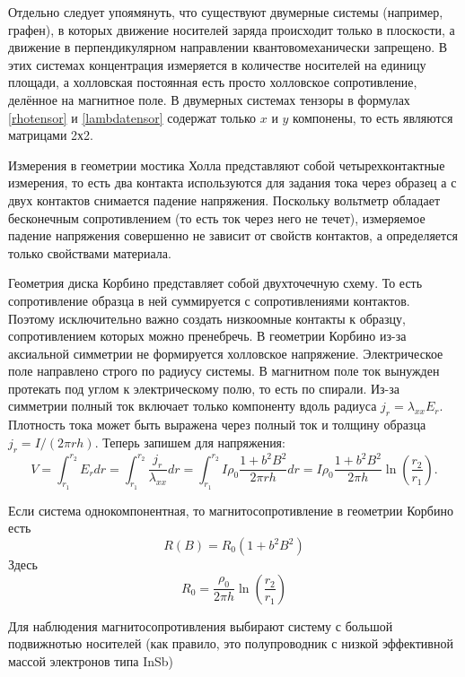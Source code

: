 Отдельно следует упоямянуть, что существуют двумерные системы (например, графен), в которых движение носителей заряда происходит только в плоскости, а движение в перпендикулярном направлении квантовомеханически запрещено. В этих системах концентрация измеряется в количестве носителей на единицу площади, а холловская постоянная есть просто холловское сопротивление, делённое на магнитное поле. В двумерных системах тензоры в формулах \ref{rhotensor} и \ref{lambdatensor} содержат только $x$ и $y$ компонены, то есть являются матрицами 2х2.

Измерения в геометрии мостика Холла представляют собой четырехконтактные измерения, то есть два контакта используются для задания тока через образец а с двух контактов снимается падение напряжения. Поскольку вольтметр обладает бесконечным сопротивлением (то есть ток через него не течет), измеряемое падение напряжения совершенно не зависит от свойств контактов, а определяется только свойствами материала.

Геометрия диска Корбино представляет собой двухточечную схему. То есть сопротивление образца в ней суммируется с сопротивлениями контактов. Поэтому исключительно важно создать низкоомные контакты к образцу, сопротивлением которых можно пренебречь. В геометрии Корбино из-за аксиальной симметрии не формируется холловское напряжение. Электрическое поле направлено строго по радиусу системы. В магнитном поле ток вынужден протекать под углом к электрическому полю, то есть по спирали. Из-за симметрии полный ток включает только компоненту вдоль радиуса $j_r=\lambda_{xx} E_r$. Плотность тока может быть выражена через полный ток и толщину образца $j_r=I/(2\pi rh)$. Теперь запишем для напряжения:
$$V=\int_{r_1}^{r_2}E_r dr=\int_{r_1}^{r_2}\frac{j_r}{\lambda_{xx}}d r=\int_{r_1}^{r_2}I\rho_{0}\frac{1+b^2B^2}{2\pi rh}dr=I\rho_{0}\frac{1+b^2B^2}{2\pi h}\ln\left(\frac{r_2}{r_1}\right).$$

Если система однокомпонентная, то магнитосопротивление в геометрии Корбино есть
 \begin{equation}
    R(B)=R_0(1+b^2B^2)
      \label{magnetosoprotivlenie}
      \end{equation}
 Здесь
 \begin{equation}
    R_0=\frac{\rho_{0}}{2\pi h}\ln\left(\frac{r_2}{r_1}\right)
      \label{KorbinoSoprot}
      \end{equation}

    
 Для наблюдения магнитосопротивления выбирают систему с  большой подвижнотью носителей (как правило, это полупроводник с низкой эффективной массой электронов типа InSb)

